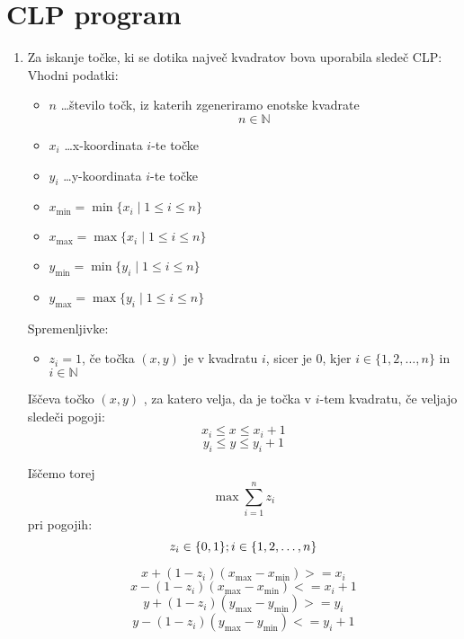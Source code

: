 \documentclass[a4, 12pt]{article}
\begin{document}
\section{CLP program}
\begin{enumerate}
\item Za iskanje točke, ki se dotika največ kvadratov bova uporabila sledeč CLP:\\

Vhodni podatki:
\begin{itemize}
\item{$n$ \dots število točk, iz katerih zgeneriramo enotske kvadrate} $$n \in \mathbb{N}$$
\item{$x_{i}$ \dots x-koordinata $i$-te točke}
\item{$y_{i}$ \dots y-koordinata $i$-te točke}
\item{$x_{\min} = \min \{x_i \mid 1 \le i \le n\}$}
\item{$x_{\max} = \max \{x_i \mid 1 \le i \le n\}$}
\item{$y_{\min} = \min \{y_i \mid 1 \le i \le n\}$}
\item{$y_{\max} = \max \{y_i \mid 1 \le i \le n\}$}
\end{itemize}

Spremenljivke:
\begin{itemize}
\item{$z_{i}= 1$, če točka $(x,y)$ je v kvadratu $i$}, sicer je $0$, kjer $i \in \{1, 2, \dots, n\}$ in $i \in \mathbb{N}$
\end{itemize}


Iščeva točko $(x,y)$ , za katero velja, da je točka v $i$-tem kvadratu, če veljajo sledeči pogoji:
$$x_i \le x \le x_i+1$$
$$y_i \le y \le y_i+1$$

Iščemo torej \\
$$\max\sum_{i=1}^n z_{i} $$
pri pogojih:
$$z_{i} \in \{0,1\};i \in \{1, 2, \dots, n\}\\$$

$$ x + (1-z_i)(x_{\max} - x_{\min}) >= x_i $$
$$ x - (1-z_i)(x_{\max} - x_{\min}) <= x_i + 1 $$
$$ y + (1-z_i)(y_{\max} - y_{\min}) >= y_i $$
$$ y - (1-z_i)(y_{\max} - y_{\min}) <= y_i + 1 $$


\end{enumerate}
\end{document}
